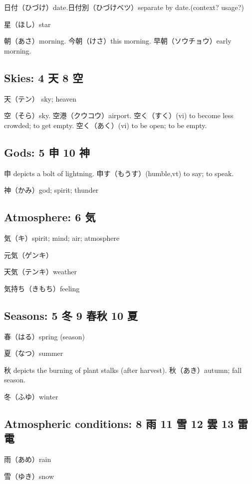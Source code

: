 日付（ひづけ）date.日付別（ひづけベツ）separate by date.(context? usage?)

星（ほし）star

朝（あさ）morning.
今朝（けさ）this morning.
早朝（ソウチョウ）early morning.

\subsection{Skies: 4 天 8 空}

天（テン） sky; heaven

空（そら）sky.
空港（クウコウ）airport.
空く（すく）(vi) to become less crowded; to get empty.
空く（あく）(vi) to be open; to be empty.

\subsection{Gods: 5 申 10 神}

申 depicts a bolt of lightning.
申す（もうす）(humble,vt) to say; to speak.

神（かみ）god; spirit; thunder

\subsection{Atmosphere: 6 気}

気（キ）spirit; mind; air; atmosphere

元気（ゲンキ）

天気（テンキ）weather

気持ち（きもち）feeling

\subsection{Seasons: 5 冬 9 春秋 10 夏}

春（はる）spring (season)

夏（なつ）summer

秋 depicts the burning of plant stalks (after harvest).
秋（あき）autumn; fall season.

冬（ふゆ）winter

\subsection{Atmospheric conditions: 8 雨 11 雪 12 雲 13 雷電}

雨（あめ）rain

雪（ゆき）snow

